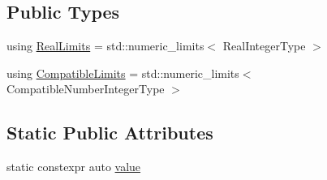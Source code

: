 \subsection*{Public Types}
\begin{DoxyCompactItemize}
\item 
using \hyperlink{structnlohmann_1_1detail_1_1is__compatible__integer__type__impl_3_01RealIntegerType_00_01Compatie5920c849e839ebb9f8c57349c900796_ab267aabfe36c5b9c305c5e5faf06ea36}{Real\+Limits} = std\+::numeric\+\_\+limits$<$ Real\+Integer\+Type $>$
\item 
using \hyperlink{structnlohmann_1_1detail_1_1is__compatible__integer__type__impl_3_01RealIntegerType_00_01Compatie5920c849e839ebb9f8c57349c900796_a24d97696ca33fba8096e452b1901a8e6}{Compatible\+Limits} = std\+::numeric\+\_\+limits$<$ Compatible\+Number\+Integer\+Type $>$
\end{DoxyCompactItemize}
\subsection*{Static Public Attributes}
\begin{DoxyCompactItemize}
\item 
static constexpr auto \hyperlink{structnlohmann_1_1detail_1_1is__compatible__integer__type__impl_3_01RealIntegerType_00_01Compatie5920c849e839ebb9f8c57349c900796_a8fd20d5e7d65d14b4e9f4ee181a3aded}{value}
\end{DoxyCompactItemize}


